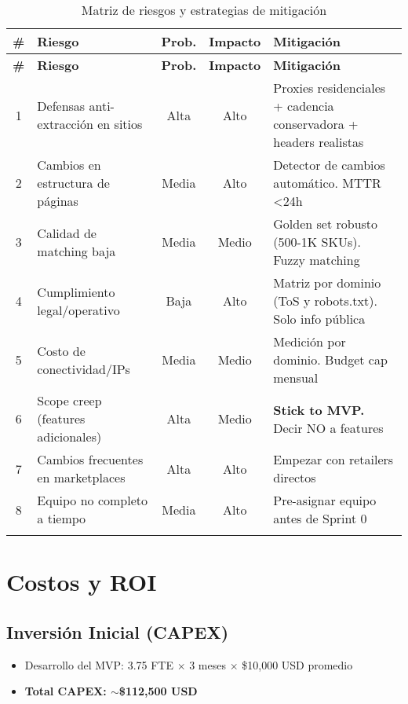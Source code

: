 \documentclass[12pt,a4paper]{article}
\begin{document}
\begin{longtable}{|c|p{3.5cm}|c|c|p{5cm}|}
\hline
\textbf{\#} & \textbf{Riesgo} & \textbf{Prob.} & \textbf{Impacto} & \textbf{Mitigación} \\
\hline
\endfirsthead
\hline
\textbf{\#} & \textbf{Riesgo} & \textbf{Prob.} & \textbf{Impacto} & \textbf{Mitigación} \\
\hline
\endhead
1 & Defensas anti-extracción en sitios & Alta & Alto & Proxies residenciales + cadencia conservadora + headers realistas \\
\hline
2 & Cambios en estructura de páginas & Media & Alto & Detector de cambios automático. MTTR <24h \\
\hline
3 & Calidad de matching baja & Media & Medio & Golden set robusto (500-1K SKUs). Fuzzy matching \\
\hline
4 & Cumplimiento legal/operativo & Baja & Alto & Matriz por dominio (ToS y robots.txt). Solo info pública \\
\hline
5 & Costo de conectividad/IPs & Media & Medio & Medición por dominio. Budget cap mensual \\
\hline
6 & Scope creep (features adicionales) & Alta & Medio & \textbf{Stick to MVP.} Decir NO a features \\
\hline
7 & Cambios frecuentes en marketplaces & Alta & Alto & Empezar con retailers directos \\
\hline
8 & Equipo no completo a tiempo & Media & Alto & Pre-asignar equipo antes de Sprint 0 \\
\hline
\caption{Matriz de riesgos y estrategias de mitigación}
\end{longtable}

\section{Costos y ROI}

\subsection{Inversión Inicial (CAPEX)}

\begin{itemize}[leftmargin=*]
    \item Desarrollo del MVP: 3.75 FTE $\times$ 3 meses $\times$ \$10,000 USD promedio
    \item \textbf{Total CAPEX: $\sim$\$112,500 USD}
\end{itemize}
\end{document}
